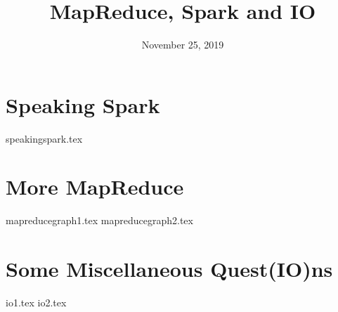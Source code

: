\documentclass[11pt]{exam}
\title{MapReduce, Spark and IO}
\date{November 25, 2019}
\begin{document}
\maketitle

\section{Speaking Spark}
\begin{questions}
{speakingspark.tex}
\end{questions}
\newpage

\section{More MapReduce}
\begin{questions}
{mapreducegraph1.tex}
{mapreducegraph2.tex}
\end{questions}
\newpage

\section{Some Miscellaneous Quest(I\/O)ns}
\begin{questions}
{io1.tex}
{io2.tex}
\end{questions}
\newpage
\end{document}
